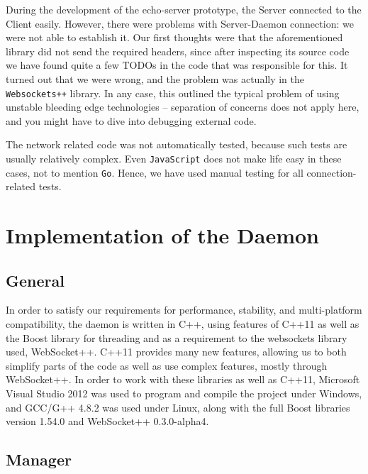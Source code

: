 \documentclass{l3proj}
\begin{document}
During the development of the echo-server prototype, the Server connected to the Client easily. However, there were problems with Server-Daemon connection: we were not able to establish it. Our first thoughts were that the aforementioned library did not send the required headers, since after inspecting its source code we have found quite a few TODOs in the code that was responsible for this. It turned out that we were wrong, and the problem was actually in the \texttt{Websockets++} library. In any case, this outlined the typical problem of using unstable bleeding edge technologies -- separation of concerns does not apply here, and you might have to dive into debugging external code.

The network related code was not automatically tested, because such tests are usually relatively complex. Even \texttt{JavaScript} does not make life easy in these cases, not to mention \texttt{Go}. Hence, we have used manual testing for all connection-related tests.


\section{Implementation of the Daemon}

\subsection{General}

In order to satisfy our requirements for performance, stability, and multi-platform compatibility, the daemon is written in C++, using features of C++11 as well as the Boost library for threading and as a requirement to the websockets library used, WebSocket++.
C++11 provides many new features, allowing us to both simplify parts of the code as well as use complex features, mostly through WebSocket++. In order to work with these libraries as well as C++11, Microsoft Visual Studio 2012 was used to program and compile the project under Windows, and GCC/G++ 4.8.2 was used under Linux, along with the full Boost libraries version 1.54.0 and WebSocket++ 0.3.0-alpha4.

\subsection{Manager}
\end{document}
